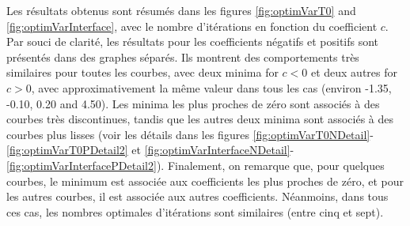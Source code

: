 \indent Les résultats obtenus sont résumés dans les figures \ref{fig:optimVarT0} and \ref{fig:optimVarInterface}, avec le nombre d'itérations en fonction du coefficient $c$. Par souci de clarité, les résultats pour les coefficients négatifs et positifs sont présentés dans des graphes séparés. Ils montrent des comportements très similaires pour toutes les courbes, avec deux minima for $c < 0$ et deux autres for $c > 0$, avec approximativement la même valeur dans tous les cas (environ -1.35, -0.10, 0.20 and 4.50). Les minima les plus proches de zéro sont associés à des courbes très discontinues, tandis que les autres deux minima sont associés à des courbes plus lisses (voir les détails dans les figures \ref{fig:optimVarT0NDetail}-\ref{fig:optimVarT0PDetail2} et \ref{fig:optimVarInterfaceNDetail}-\ref{fig:optimVarInterfacePDetail2}). Finalement, on remarque que, pour quelques courbes, le minimum est associée aux coefficients les plus proches de zéro, et pour les autres courbes, il est associée aux autres coefficients. Néanmoins, dans tous ces cas, les nombres optimales d'itérations sont similaires (entre cinq et sept).

